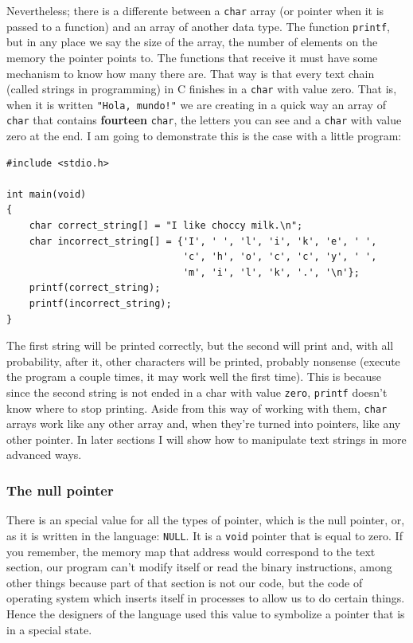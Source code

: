 \documentclass[a4paper]{article}
\begin{document}
Nevertheless; there is a differente between a \verb!char! array (or pointer when
it is passed to a function) and an array of another data type. The function
\verb!printf!, but in any place we say the size of the array, the number of
elements on the memory the pointer points to. The functions that receive it must
have some mechanism to know how many there are. That way is that every text
chain (called strings in programming) in C finishes in a \verb!char! with
value zero. That is, when it is written \verb|"Hola, mundo!"| we are creating
in a quick way an array of \verb!char! that contains \textbf{fourteen}
\verb!char!, the letters you can see and a \verb!char! with value zero at the
end. I am going to demonstrate this is the case with a little program:

\noindent
\begin{minipage}[H]{\linewidth}
\mbox{}
\begin{lstlisting}[style=C, label={lst:sizeofArraysPointers}, caption={Charr array}]
#include <stdio.h>

int main(void)
{
    char correct_string[] = "I like choccy milk.\n";
    char incorrect_string[] = {'I', ' ', 'l', 'i', 'k', 'e', ' ',
                               'c', 'h', 'o', 'c', 'c', 'y', ' ',
                               'm', 'i', 'l', 'k', '.', '\n'};
    printf(correct_string);
    printf(incorrect_string);
}
\end{lstlisting}
\end{minipage}

The first string will be printed correctly, but the second will print and,
with all probability, after it, other characters will be printed, probably
nonsense (execute the program a couple times, it may work well the first time).
This is because since the second string is not ended in a char with
value \verb!zero!, \verb!printf! doesn't know where to stop printing. Aside from
this way of working with them, \verb!char! arrays work like any other array and,
when they're turned into pointers, like any other pointer. In later sections
I will show how to manipulate text strings in more advanced ways.
\subsubsection{The null pointer}
There is an special value for all the types of pointer, which is the null
pointer, or, as it is written in the language: \verb!NULL!. It is a \verb!void!
pointer that is equal to zero. If you remember, the memory map that address
would correspond to the text section, our program can't modify itself or read
the binary instructions, among other things because part of that section is not
our code, but the code of operating system which inserts itself in processes to
allow us to do certain things. Hence the designers of the language used this
value to symbolize a pointer that is in a special state.
\end{document}
